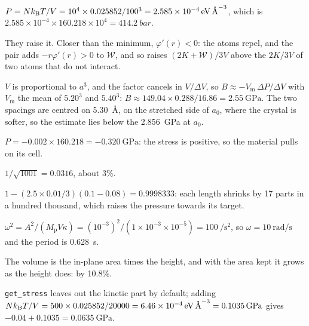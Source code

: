\label{sec:pr-answers}

$P = Nk_{\mathrm{B}} T/V = 10^4\times0.025852/100^3 =
\SI{2.585e-4}{\electronvolt\per\angstrom\cubed}$, which is $2.585\times
10^{-4}\times160.218\times10^4 = \SI{414.2}{bar}$.

They raise it. Closer than the minimum,
$\varphi'(r) < 0$: the atoms repel, and the pair adds $-r\varphi'(r) > 0$ to
$\mathcal{W}$, and so raises $(2K + \mathcal{W})/3V$ above the $2K/3V$ of
two atoms that do not interact.

$V$ is proportional to $a^3$, and the factor
cancels in $V/\Delta V$, so $B \approx -V_{\mathrm m}\,\Delta P/\Delta V$
with $V_{\mathrm m}$ the mean of $5.20^3$ and $5.40^3$: $B \approx 149.04
\times0.288/16.86 = \SI{2.55}{\giga\pascal}$. The two spacings are centred
on \SI{5.30}{\angstrom}, on the stretched side of $a_0$, where the crystal
is softer, so the estimate lies below the \SI{2.856}{\giga\pascal} at
$a_0$.

$P = -0.002\times160.218 =
\SI{-0.320}{\giga\pascal}$: the stress is positive, so the material pulls
on its cell.

$1/\sqrt{1001} = 0.0316$, about 3\%.

$1 - (2.5\times0.01/3)(0.1 - 0.08) =
0.9998333$: each length shrinks by 17 parts in a hundred thousand, which
raises the pressure towards its target.

$\omega^2 = A^2/(M_{\mathrm p}V\kappa) =
(10^{-3})^2/(1\times10^{-3}\times10^{-5}) = \SI{100}{\per\second\squared}$,
so $\omega = \SI{10}{\radian\per\second}$ and the period is
\SI{0.628}{\second}.

The volume is the in-plane area times the height,
and with the area kept it grows as the height does: by 10.8\%.

\texttt{get\_stress} leaves out the kinetic
part by default; adding $Nk_{\mathrm{B}} T/V = 500\times0.025852/20000 =
\SI{6.46e-4}{\electronvolt\per\angstrom\cubed} = \SI{0.1035}{\giga\pascal}$
gives $-0.04 + 0.1035 = \SI{0.0635}{\giga\pascal}$.
